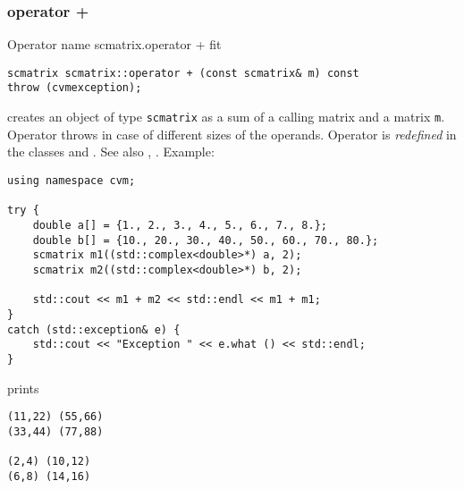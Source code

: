 \subsubsection{operator +}
Operator%
\pdfdest name {scmatrix.operator +} fit
\begin{verbatim}
scmatrix scmatrix::operator + (const scmatrix& m) const
throw (cvmexception);
\end{verbatim}
creates an object of type \verb"scmatrix" as a sum of
a calling matrix and a matrix \verb"m".
Operator throws  
in case of different sizes of the operands.
Operator is \emph{redefined} in the classes
and .
See also , .
Example:
\begin{Verbatim}
using namespace cvm;

try {
    double a[] = {1., 2., 3., 4., 5., 6., 7., 8.};
    double b[] = {10., 20., 30., 40., 50., 60., 70., 80.};
    scmatrix m1((std::complex<double>*) a, 2);
    scmatrix m2((std::complex<double>*) b, 2);

    std::cout << m1 + m2 << std::endl << m1 + m1;
}
catch (std::exception& e) {
    std::cout << "Exception " << e.what () << std::endl;
}
\end{Verbatim}
prints
\begin{Verbatim}
(11,22) (55,66)
(33,44) (77,88)

(2,4) (10,12)
(6,8) (14,16)
\end{Verbatim}
\newpage






